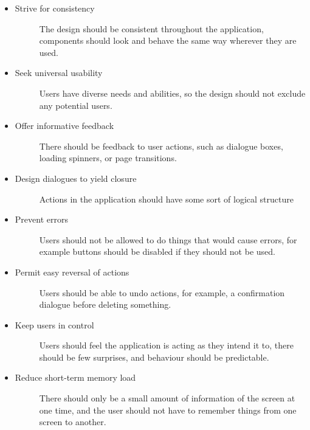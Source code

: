 \begin{itemize}
    \item Strive for consistency
    \begin{description}
        \item[] The design should be consistent throughout the application, components should look and behave the same way wherever they are used.
    \end{description}
    \item Seek universal usability
    \begin{description}
        \item[] Users have diverse needs and abilities, so the design should not exclude any potential users.
    \end{description}
    \item Offer informative feedback
    \begin{description}
        \item[] There should be feedback to user actions, such as dialogue boxes, loading spinners, or page transitions.
    \end{description}
    \item Design dialogues to yield closure
    \begin{description}
        \item[] Actions in the application should have some sort of logical structure
    \end{description}
    \item Prevent errors
    \begin{description}
        \item[] Users should not be allowed to do things that would cause errors, for example buttons should be disabled if they should not be used.
    \end{description}
    \item Permit easy reversal of actions
    \begin{description}
        \item[] Users should be able to undo actions, for example, a confirmation dialogue before deleting something.
    \end{description}
    \item Keep users in control
    \begin{description}
        \item[] Users should feel the application is acting as they intend it to, there should be few surprises, and behaviour should be predictable.
    \end{description}
    \item Reduce short-term memory load
    \begin{description}
        \item[] There should only be a small amount of information of the screen at one time, and the user should not have to remember things from one screen to another.
    \end{description}
\end{itemize}

